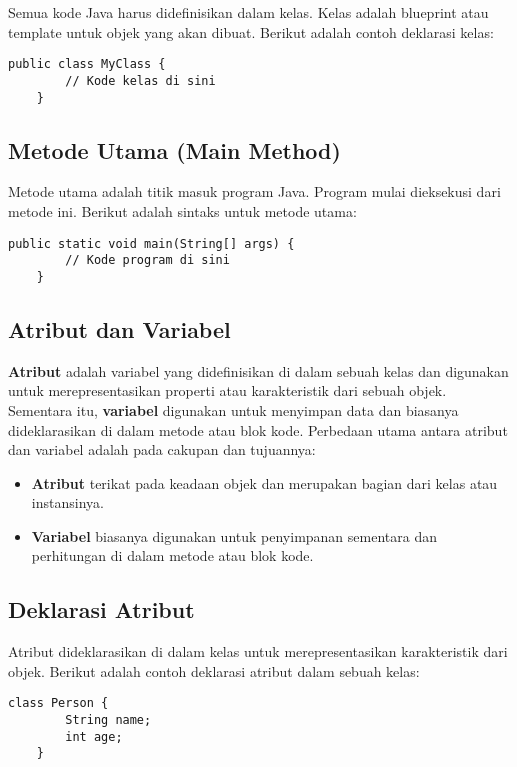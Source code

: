 Semua kode Java harus didefinisikan dalam kelas. Kelas adalah blueprint atau template untuk objek yang akan dibuat. Berikut adalah contoh deklarasi kelas:

\begin{lstlisting}[style=JavaStyle]
	public class MyClass {
		// Kode kelas di sini
	}
\end{lstlisting}

\subsection{Metode Utama (Main Method)}

Metode utama adalah titik masuk program Java. Program mulai dieksekusi dari metode ini. Berikut adalah sintaks untuk metode utama:

\begin{lstlisting}[style=JavaStyle]
	public static void main(String[] args) {
		// Kode program di sini
	}
\end{lstlisting}

\subsection{Atribut dan Variabel}
\textbf{Atribut} adalah variabel yang didefinisikan di dalam sebuah kelas dan digunakan untuk merepresentasikan properti atau karakteristik dari sebuah objek. Sementara itu, \textbf{variabel} digunakan untuk menyimpan data dan biasanya dideklarasikan di dalam metode atau blok kode. Perbedaan utama antara atribut dan variabel adalah pada cakupan dan tujuannya:
\begin{itemize}
	\item \textbf{Atribut} terikat pada keadaan objek dan merupakan bagian dari kelas atau instansinya.
	\item \textbf{Variabel} biasanya digunakan untuk penyimpanan sementara dan perhitungan di dalam metode atau blok kode.
\end{itemize}

\subsection{Deklarasi Atribut}
Atribut dideklarasikan di dalam kelas untuk merepresentasikan karakteristik dari objek. Berikut adalah contoh deklarasi atribut dalam sebuah kelas:

\begin{lstlisting}[style=JavaStyle]
	class Person {
		String name;
		int age;
	}
\end{lstlisting}

